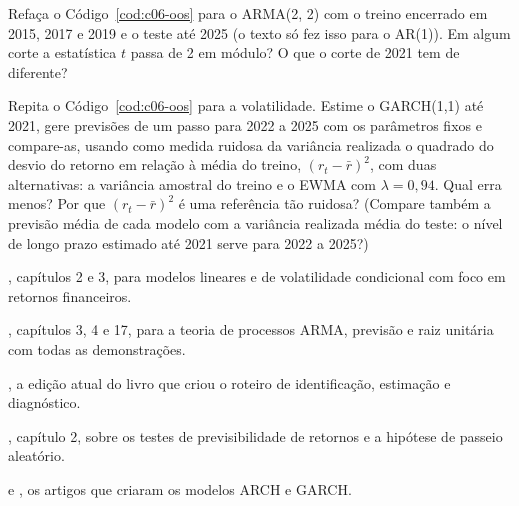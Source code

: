 \begin{exercicios}
  \item {} Refaça o Código~\ref{cod:c06-oos} para o ARMA(2, 2) com o treino encerrado em 2015, 2017 e 2019 e o teste até 2025 (o texto só fez isso para o AR(1)). Em algum corte a estatística $t$ passa de 2 em módulo? O que o corte de 2021 tem de diferente?
  \item {} Repita o Código~\ref{cod:c06-oos} para a volatilidade. Estime o GARCH(1,1) até 2021, gere previsões de um passo para 2022 a 2025 com os parâmetros fixos e compare-as, usando como medida ruidosa da variância realizada o quadrado do desvio do retorno em relação à média do treino, $(r_t - \bar r)^2$, com duas alternativas: a variância amostral do treino e o EWMA com $\lambda = 0,94$. Qual erra menos? Por que $(r_t - \bar r)^2$ é uma referência tão ruidosa? (Compare também a previsão média de cada modelo com a variância realizada média do teste: o nível de longo prazo estimado até 2021 serve para 2022 a 2025?)
\end{exercicios}

\begin{leituras}
  \item \citet{tsay2010}, capítulos 2 e 3, para modelos lineares e de volatilidade condicional com foco em retornos financeiros.
  \item \citet{hamilton1994}, capítulos 3, 4 e 17, para a teoria de processos ARMA, previsão e raiz unitária com todas as demonstrações.
  \item \citet{box2015}, a edição atual do livro que criou o roteiro de identificação, estimação e diagnóstico.
  \item \citet{campbell1997}, capítulo 2, sobre os testes de previsibilidade de retornos e a hipótese de passeio aleatório.
  \item \citet{engle1982} e \citet{bollerslev1986}, os artigos que criaram os modelos ARCH e GARCH.
\end{leituras}
